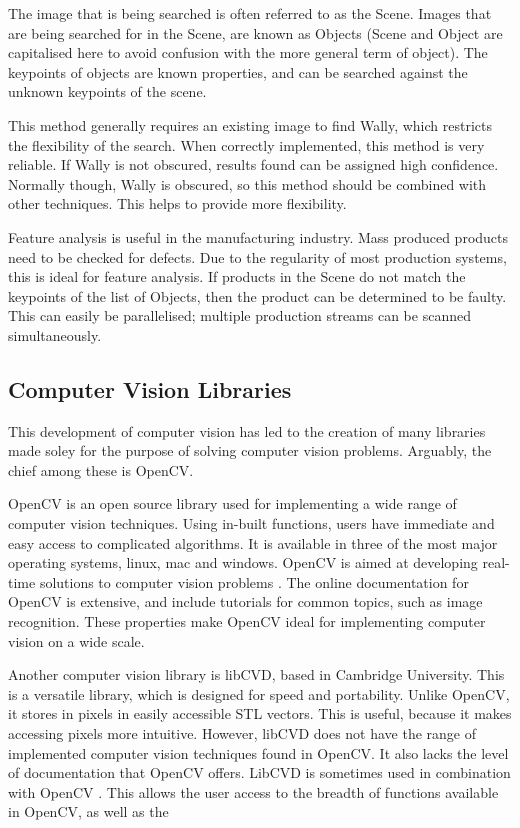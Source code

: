 \documentclass[../main.tex]{subfiles}
\begin{document}
      The image that is being searched is often referred to as the Scene.
      Images that are being searched for in the Scene, are known as Objects
      (Scene and Object are capitalised here to avoid confusion with the more general term of object).
      The keypoints of objects are known properties, and can be searched against the unknown keypoints of the scene.

      This method generally requires an existing image to find Wally, which restricts the flexibility of the search.
      When correctly implemented, this method is very reliable.
      If Wally is not obscured, results found can be assigned high confidence.
      Normally though, Wally is obscured, so this method should be combined with other techniques.
      This helps to provide more flexibility.

      Feature analysis is useful in the manufacturing industry.
      Mass produced products need to be checked for defects.
      Due to the regularity of most production systems, this is ideal for feature analysis.
      If products in the Scene do not match the keypoints of the list of Objects, then the product can be determined to be faulty.
      This can easily be parallelised; multiple production streams can be scanned simultaneously. %
  \subsection{Computer Vision Libraries}
    This development of computer vision has led to the creation of many libraries made soley for the purpose of solving computer vision problems.
    Arguably, the chief among these is OpenCV.

    OpenCV is an open source library used for implementing a wide range of computer vision techniques. 
    Using in-built functions, users have immediate and easy access to complicated algorithms.
    It is available in three of the most major operating systems, linux, mac and windows.
    OpenCV is aimed at developing real-time solutions to computer vision problems \cite{learningopencv}.
    The online documentation for OpenCV is extensive, and include tutorials for common topics, such as image recognition.
    These properties make OpenCV ideal for implementing computer vision on a wide scale.
    
    Another computer vision library is libCVD, based in Cambridge University.
    This is a versatile library, which is designed for speed and portability.
    Unlike OpenCV, it stores in pixels in easily accessible STL vectors.
    This is useful, because it makes accessing pixels more intuitive.
    However, libCVD does not have the range of implemented computer vision techniques found in OpenCV.
    It also lacks the level of documentation that OpenCV offers.
    LibCVD is sometimes used in combination with OpenCV \cite{translatar}.
    This allows the user access to the breadth of functions available in OpenCV, as well as the 
\end{document}

